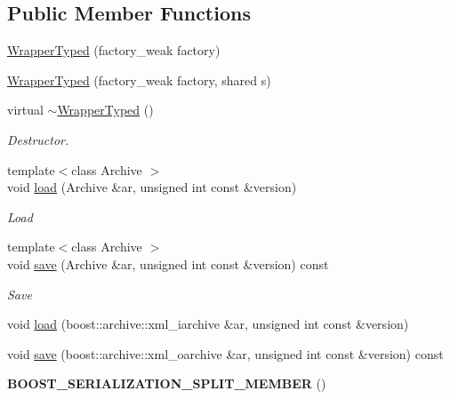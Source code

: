 \subsection*{\-Public \-Member \-Functions}
\begin{DoxyCompactItemize}
\item 
\hyperlink{classNeb_1_1WrapperTyped_ab3ae54407d5d88247591a7d05d181b4a}{\-Wrapper\-Typed} (factory\-\_\-weak factory)
\item 
\hyperlink{classNeb_1_1WrapperTyped_a390ac7ae4c75440e417c85f042f0d6b4}{\-Wrapper\-Typed} (factory\-\_\-weak factory, shared s)
\item 
\hypertarget{classNeb_1_1WrapperTyped_acca2803bb2a5c1ca4b3b5ff51a04b421}{virtual \hyperlink{classNeb_1_1WrapperTyped_acca2803bb2a5c1ca4b3b5ff51a04b421}{$\sim$\-Wrapper\-Typed} ()}\label{classNeb_1_1WrapperTyped_acca2803bb2a5c1ca4b3b5ff51a04b421}

\begin{DoxyCompactList}\small\item\em \-Destructor. \end{DoxyCompactList}\item 
\hypertarget{classNeb_1_1WrapperTyped_a293a6083747b145c8b9db4a9f1410f89}{{\footnotesize template$<$class Archive $>$ }\\void \hyperlink{classNeb_1_1WrapperTyped_a293a6083747b145c8b9db4a9f1410f89}{load} (\-Archive \&ar, unsigned int const \&version)}\label{classNeb_1_1WrapperTyped_a293a6083747b145c8b9db4a9f1410f89}

\begin{DoxyCompactList}\small\item\em \-Load \end{DoxyCompactList}\item 
\hypertarget{classNeb_1_1WrapperTyped_a756a81384782fe7820f383ea989c9ec1}{{\footnotesize template$<$class Archive $>$ }\\void \hyperlink{classNeb_1_1WrapperTyped_a756a81384782fe7820f383ea989c9ec1}{save} (\-Archive \&ar, unsigned int const \&version) const }\label{classNeb_1_1WrapperTyped_a756a81384782fe7820f383ea989c9ec1}

\begin{DoxyCompactList}\small\item\em \-Save \end{DoxyCompactList}\item 
void \hyperlink{classNeb_1_1WrapperTyped_a2fffc14882368b94658a3cbc50ba2a99}{load} (boost\-::archive\-::xml\-\_\-iarchive \&ar, unsigned int const \&version)
\item 
void \hyperlink{classNeb_1_1WrapperTyped_aeece54c65d4e1edab4d51225b0944a3c}{save} (boost\-::archive\-::xml\-\_\-oarchive \&ar, unsigned int const \&version) const 
\item 
\hypertarget{classNeb_1_1WrapperTyped_a68f3e137a2c358c596f4358c3a15d1f8}{{\bfseries \-B\-O\-O\-S\-T\-\_\-\-S\-E\-R\-I\-A\-L\-I\-Z\-A\-T\-I\-O\-N\-\_\-\-S\-P\-L\-I\-T\-\_\-\-M\-E\-M\-B\-E\-R} ()}\label{classNeb_1_1WrapperTyped_a68f3e137a2c358c596f4358c3a15d1f8}

\end{DoxyCompactItemize}
